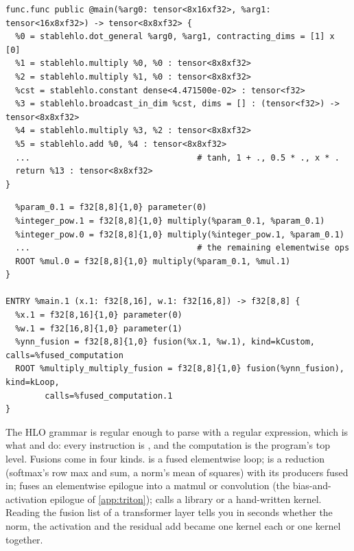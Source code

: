 \begin{lstlisting}[style=plain,caption={StableHLO for \code{gelu(x @ w)} (\code{hlo.stablehlo\_text}, abridged). Every jaxpr primitive is one op; nothing has been fused yet.},label={lst:jax:stablehlo}]
func.func public @main(%arg0: tensor<8x16xf32>, %arg1: tensor<16x8xf32>) -> tensor<8x8xf32> {
  %0 = stablehlo.dot_general %arg0, %arg1, contracting_dims = [1] x [0]
  %1 = stablehlo.multiply %0, %0 : tensor<8x8xf32>
  %2 = stablehlo.multiply %1, %0 : tensor<8x8xf32>
  %cst = stablehlo.constant dense<4.471500e-02> : tensor<f32>
  %3 = stablehlo.broadcast_in_dim %cst, dims = [] : (tensor<f32>) -> tensor<8x8xf32>
  %4 = stablehlo.multiply %3, %2 : tensor<8x8xf32>
  %5 = stablehlo.add %0, %4 : tensor<8x8xf32>
  ...                                  # tanh, 1 + ., 0.5 * ., x * .
  return %13 : tensor<8x8xf32>
}
\end{lstlisting}

\begin{lstlisting}[style=plain,caption={Optimised HLO for the same program (\code{hlo.compiled\_text}, metadata stripped). Two fusions: the matmul and one loop fusion for the whole GELU.},label={lst:jax:hlo}]
%fused_computation.1 (param_0.1: f32[8,8]) -> f32[8,8] {
  %param_0.1 = f32[8,8]{1,0} parameter(0)
  %integer_pow.1 = f32[8,8]{1,0} multiply(%param_0.1, %param_0.1)
  %integer_pow.0 = f32[8,8]{1,0} multiply(%integer_pow.1, %param_0.1)
  ...                                  # the remaining elementwise ops
  ROOT %mul.0 = f32[8,8]{1,0} multiply(%param_0.1, %mul.1)
}

ENTRY %main.1 (x.1: f32[8,16], w.1: f32[16,8]) -> f32[8,8] {
  %x.1 = f32[8,16]{1,0} parameter(0)
  %w.1 = f32[16,8]{1,0} parameter(1)
  %ynn_fusion = f32[8,8]{1,0} fusion(%x.1, %w.1), kind=kCustom, calls=%fused_computation
  ROOT %multiply_multiply_fusion = f32[8,8]{1,0} fusion(%ynn_fusion), kind=kLoop,
        calls=%fused_computation.1
}
\end{lstlisting}

The HLO grammar is regular enough to parse with a regular expression, which is what
 and  do: every instruction is
, and the  computation is the
program's top level. Fusions come in four kinds.  is a fused elementwise loop;
 is a reduction (softmax's row max and sum, a norm's mean of squares) with its
producers fused in;  fuses an elementwise epilogue into a matmul or
convolution (the bias-and-activation epilogue of \cref{app:triton});  calls a
library or a hand-written kernel. Reading the fusion list of a transformer layer tells you
in seconds whether the norm, the activation and the residual add became one kernel each or
one kernel together.

